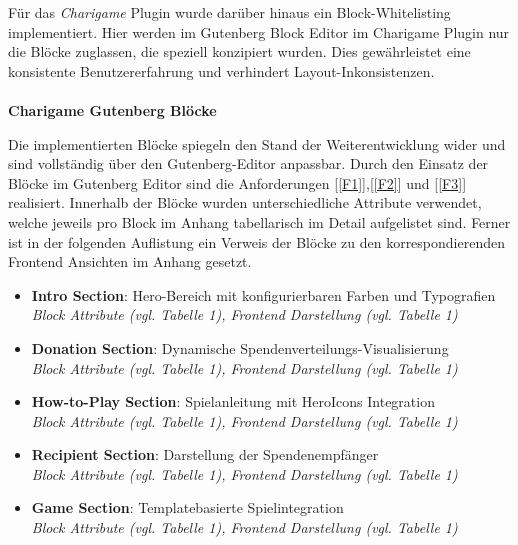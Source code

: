 Für das \textit{Charigame} Plugin wurde darüber hinaus ein Block-Whitelisting implementiert.
Hier werden im Gutenberg Block Editor im Charigame Plugin nur die Blöcke zuglassen, die speziell konzipiert wurden.
Dies gewährleistet eine konsistente Benutzererfahrung und verhindert Layout-Inkonsistenzen.
\\\\
\textbf{Charigame Gutenberg Blöcke}

Die implementierten Blöcke spiegeln den Stand der Weiterentwicklung wider und sind vollständig über den Gutenberg-Editor anpassbar.
Durch den Einsatz der Blöcke im Gutenberg Editor sind die Anforderungen [\ref{F1}],[\ref{F2}] und [\ref{F3}] realisiert.
Innerhalb der Blöcke wurden unterschiedliche Attribute verwendet, welche jeweils pro Block im Anhang tabellarisch im Detail aufgelistet sind.
Ferner ist in der folgenden Auflistung ein Verweis der Blöcke zu den korrespondierenden Frontend Ansichten im Anhang gesetzt.
\begin{itemize}
    \item \textbf{Intro Section}: Hero-Bereich mit konfigurierbaren Farben und Typografien\\
    \emph{Block Attribute (vgl. Tabelle 1), Frontend Darstellung (vgl. Tabelle 1)}
    \item \textbf{Donation Section}: Dynamische Spendenverteilungs-Visualisierung\\
    \emph{Block Attribute (vgl. Tabelle 1), Frontend Darstellung (vgl. Tabelle 1)}
    \item \textbf{How-to-Play Section}: Spielanleitung mit HeroIcons Integration\\
    \emph{Block Attribute (vgl. Tabelle 1), Frontend Darstellung (vgl. Tabelle 1)}
    \item \textbf{Recipient Section}: Darstellung der Spendenempfänger\\
    \emph{Block Attribute (vgl. Tabelle 1), Frontend Darstellung (vgl. Tabelle 1)}
    \item \textbf{Game Section}: Templatebasierte Spielintegration\\
    \emph{Block Attribute (vgl. Tabelle 1), Frontend Darstellung (vgl. Tabelle 1)}
\end{itemize}

